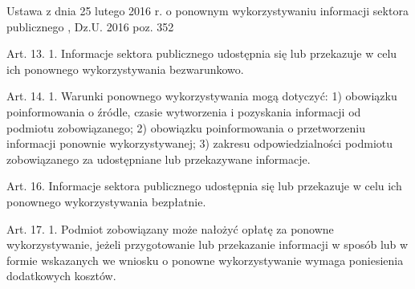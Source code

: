 Ustawa z dnia 25 lutego 2016 r. o ponownym wykorzystywaniu informacji sektora publicznego
, Dz.U. 2016 poz. 352
\begin{prawne}
Art. 13. 1. Informacje sektora publicznego udostępnia się lub przekazuje w celu
ich ponownego wykorzystywania bezwarunkowo.\end{prawne}
\begin{prawne}
Art. 14. 1. Warunki ponownego wykorzystywania mogą dotyczyć:
1) obowiązku poinformowania o źródle, czasie wytworzenia i pozyskania
informacji od podmiotu zobowiązanego;
2) obowiązku poinformowania o przetworzeniu informacji ponownie
wykorzystywanej;
3) zakresu odpowiedzialności podmiotu zobowiązanego za udostępniane lub
przekazywane informacje.\end{prawne}
\begin{prawne}
Art. 16. Informacje sektora publicznego udostępnia się lub przekazuje w celu
ich ponownego wykorzystywania bezpłatnie.\end{prawne}
\begin{prawne}
Art. 17. 1. Podmiot zobowiązany może nałożyć opłatę za ponowne
wykorzystywanie, jeżeli przygotowanie lub przekazanie informacji w sposób lub
w formie wskazanych we wniosku o ponowne wykorzystywanie wymaga
poniesienia dodatkowych kosztów.\end{prawne}
